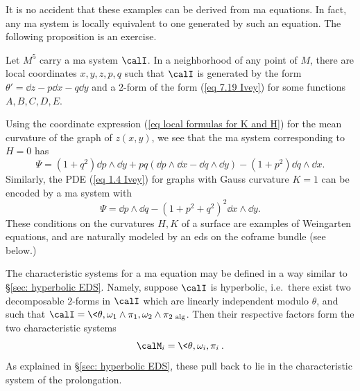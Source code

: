 It is no accident that these examples can be derived from \gls{ma} equations. In fact, any \gls{ma} system is locally equivalent to one generated by such an equation. The following proposition is an exercise.

\begin{prop}
    Let $M^5$ carry a \gls{ma} system $\calI$. In a neighborhood of any point of $M$, there are local coordinates $x,y,z,p,q$ such that $\calI$ is generated by the form $\theta'=\dd z-p\dd x-q\dd y$ and a $2$-form of the form (\ref{eq 7.19 Ivey}) for some functions $A,B,C,D,E$.
\end{prop}

\begin{example}\label{ex minimal surface EDS}
    Using the coordinate expression (\ref{eq local formulas for K and H}) for the mean curvature of the graph of $z(x,y)$, we see that the \gls{ma} system corresponding to $H=0$ has 
    \[\Psi=(1+q^2)\dd p\wedge \dd y+pq(\dd p\wedge \dd x-\dd q\wedge \dd y)-(1+p^2)\dd q\wedge \dd x.\]
    Similarly, the PDE (\ref{eq 1.4 Ivey}) for graphs with Gauss curvature $K=1$ can be encoded by a \gls{ma} system with 
    \[\Psi=\dd p\wedge \dd q-(1+p^2+q^2)^2\dd x\wedge \dd y.\]
    These conditions on the curvatures $H,K$ of a surface are examples of Weingarten equations, and are naturally modeled by an \gls{eds} on the coframe bundle (see below.)
\end{example}

The characteristic systems for a \gls{ma} equation may be defined in a way similar to \S\ref{sec: hyperbolic EDS}. Namely, suppose $\calI$ is hyperbolic, i.e.\ there exist two decomposable $2$-forms in $\calI$ which are linearly independent modulo $\theta$, and such that $\calI=\<\theta,\omega_1\wedge\pi_1,\omega_2\wedge\pi_2\>_{\mathrm{alg}}$. Then their respective factors form the two characteristic systems 
\[\calM_i=\<\theta,\omega_i,\pi_i\>.\]
As explained in  \S\ref{sec: hyperbolic EDS}, these pull back to lie in the characteristic system of the prolongation.

